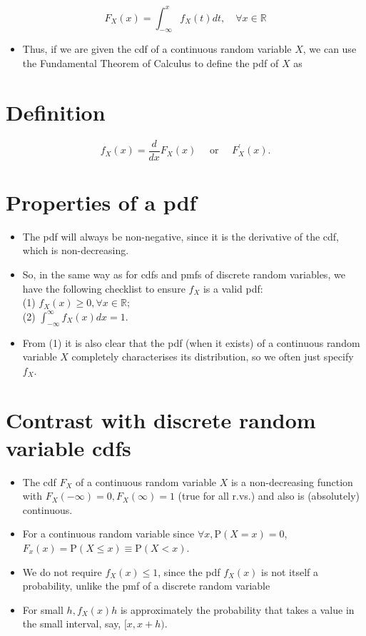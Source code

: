 \documentclass[10pt]{article}
\begin{document}
$$
F_{X}(x)=\int_{-\infty}^{x} f_{X}(t) d t, \quad \forall x \in \mathbb{R}
$$

\begin{itemize}
  \item Thus, if we are given the cdf of a continuous random variable $X$, we can use the Fundamental Theorem of Calculus to define the pdf of $X$ as
\end{itemize}

\section*{Definition}
$$
f_{X}(x)=\frac{d}{d x} F_{X}(x) \quad \text { or } \quad F_{X}^{\prime}(x) .
$$

\section*{Properties of a pdf}
\begin{itemize}
  \item The pdf will always be non-negative, since it is the derivative of the cdf, which is non-decreasing.
  \item So, in the same way as for cdfs and pmfs of discrete random variables, we have the following checklist to ensure $f_{X}$ is a valid pdf:\\
(1) $f_{X}(x) \geq 0, \forall x \in \mathbb{R}$;\\
(2) $\int_{-\infty}^{\infty} f_{X}(x) d x=1$.
  \item From (1) it is also clear that the pdf (when it exists) of a continuous random variable $X$ completely characterises its distribution, so we often just specify $f_{X}$.
\end{itemize}

\section*{Contrast with discrete random variable cdfs}
\begin{itemize}
  \item The cdf $F_{X}$ of a continuous random variable $X$ is a non-decreasing function with $F_{X}(-\infty)=0, F_{X}(\infty)=1$ (true for all r.vs.) and also is (absolutely) continuous.
  \item For a continuous random variable since $\forall x, \mathrm{P}(X=x)=0$, $F_{x}(x)=\mathrm{P}(X \leq x) \equiv \mathrm{P}(X<x)$.
  \item We do not require $f_{X}(x) \leq 1$, since the pdf $f_{X}(x)$ is not itself a probability, unlike the pmf of a discrete random variable
  \item For small $h, f_{X}(x) h$ is approximately the probability that takes a value in the small interval, say, $[x, x+h)$.
\end{itemize}
\end{document}
